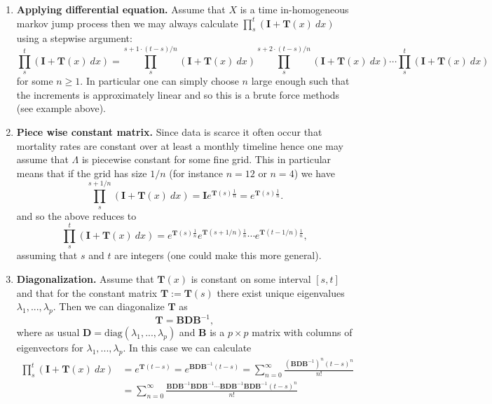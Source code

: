 \documentclass[
]{book}
\providecommand{\tightlist}{%
  \setlength{\itemsep}{0pt}\setlength{\parskip}{0pt}}
\begin{document}
\begin{enumerate}
\def\labelenumi{\arabic{enumi}.}
\tightlist
\item
  \textbf{Applying differential equation.} Assume that \(X\) is a time in-homogeneous markov jump process then we may always calculate \(\prod_s^t(\mathbf I + \mathbf T(x)\ dx)\) using a stepwise argument:
  \[
    \prod_s^t(\mathbf I + \mathbf T(x)\ dx)=\prod_s^{s+1\cdot (t-s)/n}(\mathbf I + \mathbf T(x)\ dx)\prod_s^{s+2\cdot (t-s)/n}(\mathbf I + \mathbf T(x)\ dx)\cdots\prod_s^{t}(\mathbf I + \mathbf T(x)\ dx)
    \]
  for some \(n\ge 1\). In particular one can simply choose \(n\) large enough such that the increments is approximately linear and so this is a brute force methods (see example above).
\item
  \textbf{Piece wise constant matrix.} Since data is scarce it often occur that mortality rates are constant over at least a monthly timeline hence one may assume that \(\Lambda\) is piecewise constant for some fine grid. This in particular means that if the grid has size \(1/n\) (for instance \(n=12\) or \(n=4\)) we have
  \[
    \prod_s^{s+1/n}(\mathbf I + \mathbf T(x)\ dx)=\mathbf{I}e^{\mathbf{T}(s)\frac{1}{n}}=e^{\mathbf{T}(s)\frac{1}{n}}.
    \]
  and so the above reduces to
  \[
    \prod_s^t(\mathbf I + \mathbf T(x)\ dx)=e^{\mathbf{T}(s)\frac{1}{n}}e^{\mathbf{T}(s+1/n)\frac{1}{n}}\cdots e^{\mathbf{T}(t-1/n)\frac{1}{n}},
    \]
  assuming that \(s\) and \(t\) are integers (one could make this more general).
\item
  \textbf{Diagonalization.} Assume that \(\mathbf{T}(x)\) is constant on some interval \([s,t]\) and that for the constant matrix \(\mathbf{T}:=\mathbf{T}(s)\) there exist unique eigenvalues \(\lambda_1,...,\lambda_p\). Then we can diagonalize \(\mathbf{T}\) as
  \[
    \mathbf{T}=\mathbf{B}\mathbf{D}\mathbf{B}^{-1},
    \]
  where as usual \(\mathbf{D}=\text{diag}(\lambda_1,...,\lambda_p)\) and \(\mathbf{B}\) is a \(p\times p\) matrix with columns of eigenvectors for \(\lambda_1,...,\lambda_p\). In this case we can calculate
  \begin{align*}
    \prod_s^t(\mathbf I + \mathbf T(x)\ dx)&=e^{\mathbf{T}(t-s)}=e^{\mathbf{B}\mathbf{D}\mathbf{B}^{-1}(t-s)}=\sum_{n=0}^\infty \frac{\left(\mathbf{B}\mathbf{D}\mathbf{B}^{-1}\right)^n(t-s)^n}{n!}\\
    &=\sum_{n=0}^\infty \frac{\mathbf{B}\mathbf{D}\mathbf{B}^{-1}\mathbf{B}\mathbf{D}\mathbf{B}^{-1}\cdots \mathbf{B}\mathbf{D}\mathbf{B}^{-1}\mathbf{B}\mathbf{D}\mathbf{B}^{-1}(t-s)^n}{n!}\\

\end{align*}
\end{enumerate}
\end{document}
